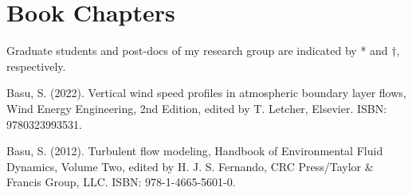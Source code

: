 \section*{Book Chapters}
Graduate students and post-docs of my research group are indicated by * and $\dagger$, respectively.\\ 

\normalsize

\begin{etaremune}[topsep=0pt,itemsep=0pt,partopsep=0pt,parsep=0pt]

\item Basu, S. (2022). Vertical wind speed profiles in atmospheric boundary layer flows, Wind Energy Engineering, 2nd Edition, edited by T. Letcher, Elsevier. ISBN: 9780323993531.

\item Basu, S. (2012). Turbulent flow modeling, Handbook of Environmental Fluid Dynamics, Volume Two, edited by H. J. S. Fernando, CRC Press/Taylor \& Francis Group, LLC. ISBN: 978-1-4665-5601-0.

\end{etaremune}

